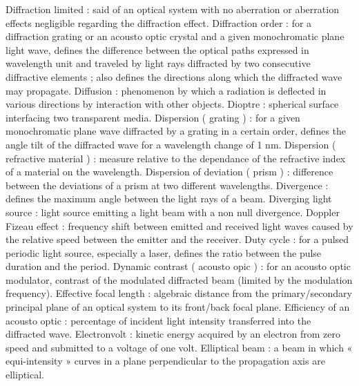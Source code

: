 Diffraction limited                                  : said of an optical system with no aberration or aberration effects negligible regarding the diffraction effect.
Diffraction order                                    : for a diffraction grating or an acousto optic crystal and a given monochromatic plane light wave, defines the difference between the optical paths expressed in wavelength unit and traveled by light rays diffracted by two consecutive diffractive elements ; also defines the directions along which the diffracted wave may propagate.
Diffusion                                            : phenomenon by which a radiation is deflected in various directions by interaction with other objects.
Dioptre                                              : spherical surface interfacing two transparent media.
Dispersion ( grating )                               : for a given monochromatic plane wave diffracted by a grating in a certain order, defines the angle tilt of the diffracted wave for a wavelength change of 1 nm.
Dispersion ( refractive material )                   : measure relative to the dependance of the refractive index of a material on the wavelength.
Dispersion of deviation ( prism )                    : difference between the deviations of a prism at two different wavelengths.
Divergence                                           : defines the maximum angle between the light rays of a beam.
Diverging light source                               : light source emitting a light beam with a non null divergence.
Doppler Fizeau effect                                : frequency shift between emitted and received light waves caused by the relative speed between the emitter and the receiver.
Duty cycle                                           : for a pulsed periodic light source, especially a laser, defines the ratio between the pulse duration and the period.
Dynamic contrast ( acousto opic )                    : for an acousto optic modulator, contrast of the modulated diffracted beam (limited by the modulation frequency).
Effective focal length                               : algebraic distance from the primary/secondary principal plane of an optical system to its front/back focal plane.
Efficiency of an acousto optic                       : percentage of incident light intensity transferred into the diffracted wave.
Electronvolt                                         : kinetic energy acquired by an electron from zero speed and submitted to a voltage of one volt.
Elliptical beam                                      : a beam in which « equi-intensity » curves in a plane perpendicular to the propagation axis are elliptical.
